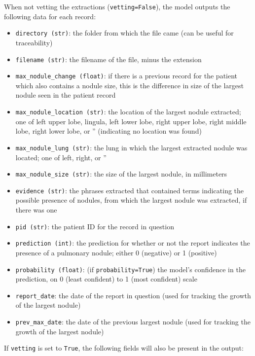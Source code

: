 \documentclass[11pt]{article}
\providecommand{\tightlist}{%
      \setlength{\itemsep}{0pt}\setlength{\parskip}{0pt}}
\begin{document}
When not vetting the extractions (\texttt{vetting=False}), the model
outputs the following data for each record:

\begin{itemize}
\tightlist
\item
  \texttt{directory\ (str)}: the folder from which the file came (can be
  useful for traceability)
\item
  \texttt{filename\ (str)}: the filename of the file, minus the
  extension
\item
  \texttt{max\_nodule\_change\ (float)}: if there is a previous record
  for the patient which also contains a nodule size, this is the
  difference in size of the largest nodule seen in the patient record
\item
  \texttt{max\_nodule\_location\ (str)}: the location of the largest
  nodule extracted; one of left upper lobe, lingula, left lower lobe,
  right upper lobe, right middle lobe, right lower lobe, or ''
  (indicating no location was found)
\item
  \texttt{max\_nodule\_lung\ (str)}: the lung in which the largest
  extracted nodule was located; one of left, right, or ''
\item
  \texttt{max\_nodule\_size\ (str)}: the size of the largest nodule, in
  millimeters
\item
  \texttt{evidence\ (str)}: the phrases extracted that contained terms
  indicating the possible presence of nodules, from which the largest
  nodule was extracted, if there was one
\item
  \texttt{pid\ (str)}: the patient ID for the record in question
\item
  \texttt{prediction\ (int)}: the prediction for whether or not the
  report indicates the presence of a pulmonary nodule; either 0
  (negative) or 1 (positive)
\item
  \texttt{probability\ (float)}: (if \texttt{probability=True}) the
  model's confidence in the prediction, on 0 (least confident) to 1
  (most confident) scale
\item
  \texttt{report\_date}: the date of the report in question (used for
  tracking the growth of the largest nodule)
\item
  \texttt{prev\_max\_date}: the date of the previous largest nodule
  (used for tracking the growth of the largest nodule)
\end{itemize}

If \texttt{vetting} is set to \texttt{True}, the following fields will
also be present in the output:
\end{document}
